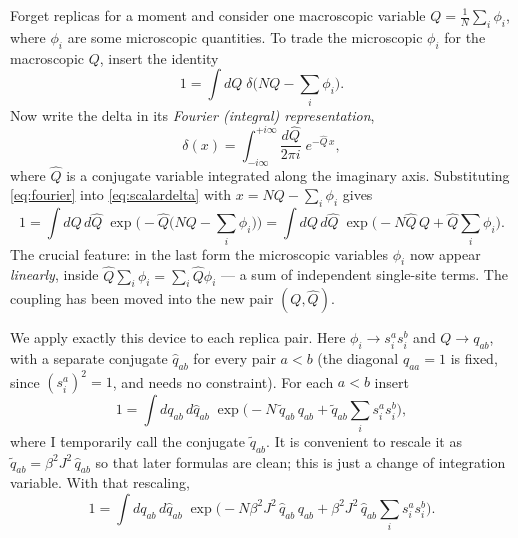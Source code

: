 \documentclass[nobib,justified]{tufte-handout}
\begin{document}
 Forget replicas for a moment and
consider one macroscopic variable $Q=\frac1N\sum_i \phi_i$, where $\phi_i$
are some microscopic quantities. To trade the microscopic $\phi_i$ for the
macroscopic $Q$, insert the identity
\begin{equation}\label{eq:scalardelta}
  1 = \int dQ\;\delta\!\Big(NQ-\sum_i\phi_i\Big).
\end{equation}
Now write the delta in its \emph{Fourier (integral) representation},
\begin{equation}\label{eq:fourier}
  \delta(x)=\int_{-i\infty}^{+i\infty}\frac{d\hat Q}{2\pi i}\;
            e^{-\hat Q\,x},
\end{equation}
where $\hat Q$ is a conjugate variable integrated along the imaginary
axis. Substituting \eqref{eq:fourier} into
\eqref{eq:scalardelta} with $x=NQ-\sum_i\phi_i$ gives
\begin{equation}\label{eq:scalarfull}
  1 = \int dQ\,d\hat Q\;
      \exp\!\Big(-\hat Q\big(NQ-\textstyle\sum_i\phi_i\big)\Big)
    = \int dQ\,d\hat Q\;
      \exp\!\Big(-N\hat Q\,Q + \hat Q\textstyle\sum_i\phi_i\Big).
\end{equation}
The crucial feature: in the last form the microscopic variables $\phi_i$
now appear \emph{linearly}, inside $\hat Q\sum_i\phi_i=\sum_i\hat Q\phi_i$
--- a sum of independent single-site terms. The coupling has been moved
into the new pair $(Q,\hat Q)$.

 We apply exactly this device to each
replica pair. Here $\phi_i\to s_i^a s_i^b$ and $Q\to q_{ab}$, with a
separate conjugate $\hat q_{ab}$ for every pair $a<b$ (the diagonal
$q_{aa}=1$ is fixed, since $(s_i^a)^2=1$, and needs no constraint). For each
$a<b$ insert
\begin{equation}\label{eq:matdelta}
  1 = \int dq_{ab}\,d\hat q_{ab}\;
      \exp\!\Big(-N\,\tilde q_{ab}\,q_{ab}
      + \tilde q_{ab}\textstyle\sum_i s_i^a s_i^b\Big),
\end{equation}
where I temporarily call the conjugate $\tilde q_{ab}$. It is convenient to
rescale it as $\tilde q_{ab}=\beta^2 J^2\,\hat q_{ab}$ so that later
formulas are clean; this is just a change of integration variable. With
that rescaling,
\begin{equation}\label{eq:matdelta2}
  1 = \int dq_{ab}\,d\hat q_{ab}\;
      \exp\!\Big(-N\beta^2 J^2\,\hat q_{ab}\,q_{ab}
      + \beta^2 J^2\,\hat q_{ab}\textstyle\sum_i s_i^a s_i^b\Big).
\end{equation}
\end{document}
